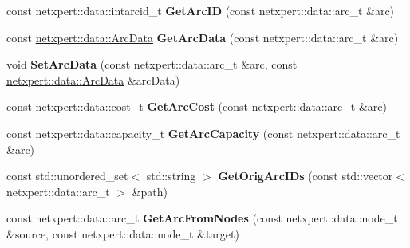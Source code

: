 \begin{DoxyCompactItemize}
\item 
const netxpert\+::data\+::intarcid\+\_\+t {\bfseries Get\+Arc\+ID} (const netxpert\+::data\+::arc\+\_\+t \&arc)\hypertarget{classnetxpert_1_1InternalNet_a9ce19233f535b871c896c04508a7f1cc}{}\label{classnetxpert_1_1InternalNet_a9ce19233f535b871c896c04508a7f1cc}

\item 
const \hyperlink{structnetxpert_1_1data_1_1ArcData}{netxpert\+::data\+::\+Arc\+Data} {\bfseries Get\+Arc\+Data} (const netxpert\+::data\+::arc\+\_\+t \&arc)\hypertarget{classnetxpert_1_1InternalNet_adcf5e8f339b55f53e3ee1463310addf4}{}\label{classnetxpert_1_1InternalNet_adcf5e8f339b55f53e3ee1463310addf4}

\item 
void {\bfseries Set\+Arc\+Data} (const netxpert\+::data\+::arc\+\_\+t \&arc, const \hyperlink{structnetxpert_1_1data_1_1ArcData}{netxpert\+::data\+::\+Arc\+Data} \&arc\+Data)\hypertarget{classnetxpert_1_1InternalNet_a80d3e9b08052c51b453950b6a3f8426a}{}\label{classnetxpert_1_1InternalNet_a80d3e9b08052c51b453950b6a3f8426a}

\item 
const netxpert\+::data\+::cost\+\_\+t {\bfseries Get\+Arc\+Cost} (const netxpert\+::data\+::arc\+\_\+t \&arc)\hypertarget{classnetxpert_1_1InternalNet_a993c97d71c173378190624650fe98d7d}{}\label{classnetxpert_1_1InternalNet_a993c97d71c173378190624650fe98d7d}

\item 
const netxpert\+::data\+::capacity\+\_\+t {\bfseries Get\+Arc\+Capacity} (const netxpert\+::data\+::arc\+\_\+t \&arc)\hypertarget{classnetxpert_1_1InternalNet_a2bb02620417c4cd6888f24d9e2d210d2}{}\label{classnetxpert_1_1InternalNet_a2bb02620417c4cd6888f24d9e2d210d2}

\item 
const std\+::unordered\+\_\+set$<$ std\+::string $>$ {\bfseries Get\+Orig\+Arc\+I\+Ds} (const std\+::vector$<$ netxpert\+::data\+::arc\+\_\+t $>$ \&path)\hypertarget{classnetxpert_1_1InternalNet_aed560db8ae49a08ab624a699b0d2e1bc}{}\label{classnetxpert_1_1InternalNet_aed560db8ae49a08ab624a699b0d2e1bc}

\item 
const netxpert\+::data\+::arc\+\_\+t {\bfseries Get\+Arc\+From\+Nodes} (const netxpert\+::data\+::node\+\_\+t \&source, const netxpert\+::data\+::node\+\_\+t \&target)\hypertarget{classnetxpert_1_1InternalNet_aef0c2e3455e1710b27c864271a6d46d5}{}\label{classnetxpert_1_1InternalNet_aef0c2e3455e1710b27c864271a6d46d5}


\end{DoxyCompactItemize}
